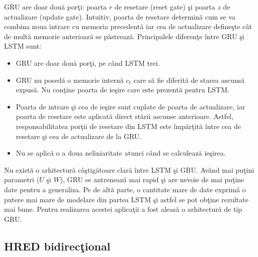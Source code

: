 GRU are doar dou\u a por\c ti: poarta \(r\) de resetare (reset gate) \c si poarta \(z\) de actualizare (update gate). Intuitiv, poarta de resetare determin\u a cum se va combina noua intrare cu memoria precedent\u a iar cea de actualizare define\c ste c\^ at de mult\u a memorie anterioar\u a se p\u astreaz\u a. Principalele diferen\c te \^ intre GRU \c si LSTM sunt:
\begin{itemize}
  \item GRU are doar dou\u a por\c ti, pe c\^ and LSTM trei.
  \item GRU nu posed\u a o memorie intern\u a \(c_{t}\) care s\u a fie diferit\u a de starea ascuns\u a expus\u a. Nu con\c tine poarta de ie\c sire care este prezent\u a pentru LSTM.
  \item Poarta de intrare \c si cea de ie\c sire sunt cuplate de poarta de actualizare, iar poarta de resetare este aplicat\u a direct st\u arii ascunse anterioare. Astfel, responsabilitatea por\c tii de resetare din LSTM este \^ imp\u ar\c tit\u a \^ intre cea de resetare \c si cea de actualizare de la GRU.
  \item Nu se aplic\u a o a doua neliniaritate atunci c\^ and se calculeaz\u a ie\c sirea.
\end{itemize}

Nu exist\u a o arhitectur\u a c\^ a\c stig\u atoare clar\u a \^ intre LSTM \c si GRU. Av\^ and mai pu\c tini parametri (\(U\) \c si \(W\)), GRU se antreneaz\u a mai rapid \c si are nevoie de mai pu\c tine date pentru a generaliza. Pe de alt\u a parte, o cantitate mare de date	exprim\u a o putere mai mare de modelare din partea LSTM \c si astfel se pot ob\c tine rezultate mai bune. Pentru realizarea acestei aplica\c tii a fost aleas\u a o arhitectur\u a de tip GRU.

\subsection{HRED bidirec\c tional}

